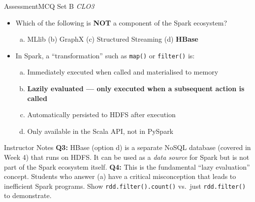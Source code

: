 \documentclass[aspectratio=169,10pt]{beamer}
\begin{document}
\begin{frame}{Assessment\textemdash MCQ Set B \hfill\small\textit{CLO3}}
  \vspace{6pt}
  \begin{itemize}
    \item[\textbf{Q3.}] Which of the following is \textbf{NOT} a component of the Spark ecosystem?
    \begin{enumerate}[(a)]
      \item MLlib \quad (b) GraphX \quad (c) Structured Streaming \quad (d) \textbf{HBase}
    \end{enumerate}
  \end{itemize}
  \vspace{8pt}
  \begin{itemize}
    \item[\textbf{Q4.}] In Spark, a ``transformation'' such as \texttt{map()} or \texttt{filter()} is:
    \begin{enumerate}[(a)]
      \item Immediately executed when called and materialised to memory
      \item \textbf{Lazily evaluated --- only executed when a subsequent action is called}
      \item Automatically persisted to HDFS after execution
      \item Only available in the Scala API, not in PySpark
    \end{enumerate}
  \end{itemize}
  \vspace{8pt}
  \begin{alertblock}{Instructor Notes}
    \textbf{Q3:} HBase (option d) is a separate NoSQL database (covered in Week 4) that runs on HDFS.  It can be used as a \emph{data source} for Spark but is not part of the Spark ecosystem itself.  \textbf{Q4:} This is the fundamental ``lazy evaluation'' concept.  Students who answer (a) have a critical misconception that leads to inefficient Spark programs.  Show \texttt{rdd.filter().count()} vs.\ just \texttt{rdd.filter()} to demonstrate.
  \end{alertblock}
\end{frame}
\end{document}
